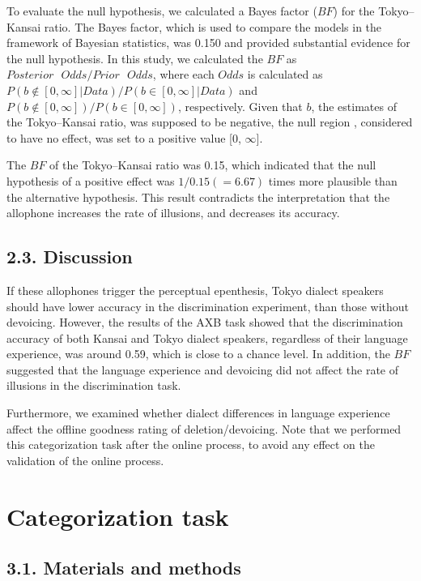 \documentclass[a4paper,11pt,twocolumn]{article}
\begin{document}
To evaluate the null hypothesis, we calculated a Bayes factor ($BF$) for the Tokyo--Kansai ratio. The Bayes factor, which is used to compare the models in the framework of Bayesian statistics, was 0.150 and provided substantial evidence for the null hypothesis. In this study, we calculated the $BF$ as $Posterior \text{ }Odds / Prior \text{ }Odds$, where each $Odds$ is calculated as $P(b\notin[0, \infty] | Data)/P(b\in[0, \infty] | Data)$ and $P(b\notin[0, \infty])/P(b\in[0, \infty])$, respectively. Given that $b$, the estimates of the Tokyo--Kansai ratio, was supposed to be negative, the null region \cite{kruschke2010believe}, considered to have no effect, was set to a positive value [0, $\infty$].

The $BF$ of the Tokyo--Kansai ratio was 0.15, which indicated that the null hypothesis of a positive effect was $1/0.15(=6.67)$ times more plausible than the alternative hypothesis. This result contradicts the interpretation that the allophone increases the rate of illusions, and decreases its accuracy.

\subsection{2.3. Discussion}

If these allophones trigger the perceptual epenthesis, Tokyo dialect speakers should have lower accuracy in the discrimination experiment, than those without devoicing. However, the results of the AXB task showed that the discrimination accuracy of both Kansai and Tokyo dialect speakers, regardless of their language experience, was around 0.59, which is close to a chance level. In addition, the $BF$ suggested that the language experience and devoicing did not affect the rate of illusions in the discrimination task.

Furthermore, we examined whether dialect differences in language experience affect the offline goodness rating of deletion/devoicing. Note that we performed this categorization task after the online process, to avoid any effect on the validation of the online process.

\section{Categorization task}

\subsection{3.1. Materials and methods}
\end{document}

